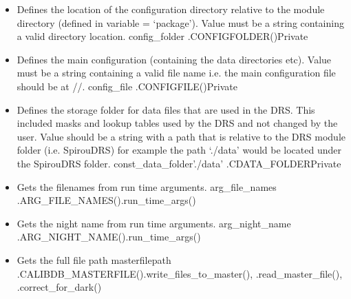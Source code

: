 \begin{itemize}


\item {} 
{Defines the location of the configuration directory relative to the module directory (defined in variable = `package'). Value must be a string containing a valid directory location.}
{config\_folder}{\configdirrelpath}
{\AllRecipes}{\spirouConst.CONFIGFOLDER()}{\AllRecipes}{Private}


\item {} 
{Defines the main configuration (containing the data directories etc).  Value must be a string containing a valid file name i.e. the main configuration file should be at //.}
{config\_file}{\configtxtfile}
{\AllRecipes}{\spirouConst.CONFIGFILE()}{\AllRecipes}{Private}


\item {} 
{Defines the storage folder for data files that are used in the DRS. This included masks and lookup tables used by the DRS and not changed by the user. Value should be a string with a path that is relative to the DRS module folder (i.e. SpirouDRS) for example the path `./data' would be located under the SpirouDRS folder.}
{const\_data\_folder}{'./data'}
{\AllRecipes}{\spirouConst.CDATA\_FOLDER}{\AllRecipes}{Private}


\item {} 
{Gets the filenames from run time arguments.}
{arg\_file\_names}
{\AllRecipes}{\spirouConst.ARG\_FILE\_NAMES()}{\spirouStartup.run\_time\_args()}


\item {} 
{Gets the night name from run time arguments.}
{arg\_night\_name}
{\AllRecipes}{\spirouConst.ARG\_NIGHT\_NAME()}{\spirouStartup.run\_time\_args()}


\item {}
{Gets the full \calibdb file path}
{masterfilepath}
{\AllRecipes}{\spirouConst.CALIBDB\_MASTERFILE()}{\spirouCDB.write\_files\_to\_master(), \spirouCDB.read\_master\_file(), \spirouImage.correct\_for\_dark()}



\end{itemize}
